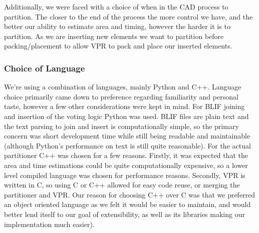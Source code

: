 \documentclass[12pt,final,oneside]{memoir} %
\begin{document}
Additionally, we were faced with a choice of when in the \ac{CAD} process to partition. The closer to the end of the process the more control we have, and the better our ability to estimate area and timing, however the harder it is to partition. As we are inserting new elements we want to partition before packing/placement to allow \ac{VPR} to pack and place our inserted elements.

\subsubsection{Choice of Language}
We're using a combination of languages, mainly Python and C++. Language choice primarily came down to preference regarding familiarity and personal taste, however a few other considerations were kept in mind.
For \ac{BLIF} joining and insertion of the voting logic Python was used. \ac{BLIF} files are plain text and the text parsing to join and insert is computationally simple, so the primary concern was short development time while still being readable and maintainable (although Python's performance on text is still quite reasonable)\cite{LanguageBenchmark}.
For the actual partitioner C++ was chosen for a few reasons. Firstly, it was expected that the area and time estimations could be quite computationally expensive, so a lower level compiled language was chosen for performance reasons\cite{LanguageBenchmark}. Secondly, \ac{VPR} is written in C, so using C or C++ allowed for easy code reuse, or merging the partitioner and \ac{VPR}. Our reason for choosing C++ over C was that we preferred an object oriented language as we felt it would be easier to maintain, and would better lend itself to our goal of extensibility, as well as its libraries making our implementation much easier).
\end{document}
